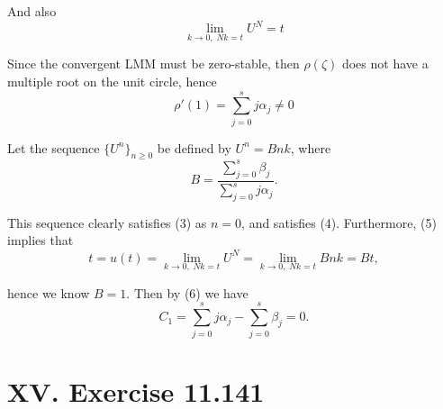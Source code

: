 \documentclass[twoside,a4paper]{article}
\begin{document}
And also
\begin{equation}
    \lim_{k\to 0,\; Nk=t} U^{N}=t
\end{equation}

Since the convergent LMM must be zero-stable, then $\rho(\zeta)$ does not have a multiple root on the unit circle, hence
\begin{equation*}
    \rho'(1)=\sum_{j=0}^s j\alpha_j\neq 0
\end{equation*}

Let the sequence $\{U^n\}_{n\geq 0}$ be defined by $U^n=Bnk$, where
\begin{equation}
    B=\frac{\sum_{j=0}^s \beta_j}{\sum_{j=0}^s j\alpha_j}.
\end{equation}

This sequence clearly satisfies (3) as $n=0$, and satisfies (4). Furthermore, (5) implies that
\begin{equation*}
    t=u(t)=\lim_{k\to 0,\;Nk=t} U^N = \lim_{k\to 0,\; Nk=t} Bnk = Bt,
\end{equation*}

hence we know $B=1$. Then by (6) we have
\begin{equation*}
    C_1=\sum_{j=0}^s j\alpha_j-\sum_{j=0}^s \beta_j=0.
\end{equation*}

\section*{XV. Exercise 11.141}
\end{document}
